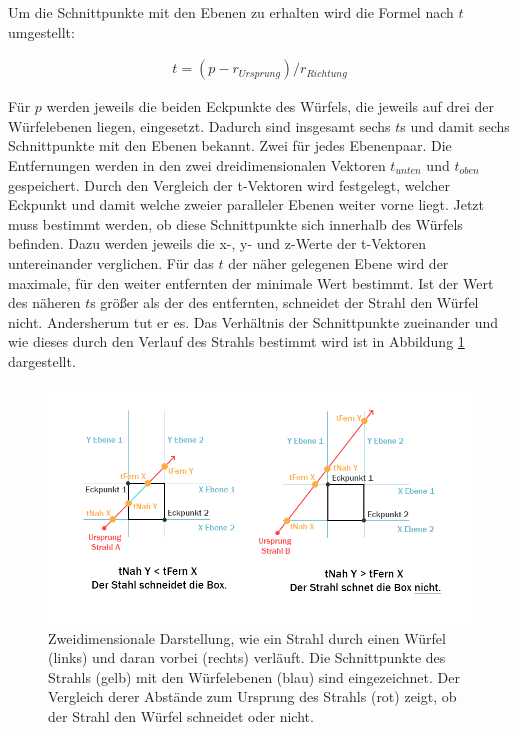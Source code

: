 Um die Schnittpunkte mit den Ebenen zu erhalten wird die Formel nach $t$ umgestellt:

\begin{align}
t=(p-r_{Ursprung})/r_{Richtung}
\end{align}

Für $p$ werden jeweils die beiden Eckpunkte des Würfels, die jeweils auf drei der Würfelebenen liegen, eingesetzt.
Dadurch sind insgesamt sechs $t$s und damit sechs Schnittpunkte mit den Ebenen bekannt. Zwei für jedes Ebenenpaar. Die Entfernungen werden in den zwei dreidimensionalen Vektoren $t_{unten}$ und $t_{oben}$ gespeichert. Durch den Vergleich der t-Vektoren wird festgelegt, welcher Eckpunkt und damit welche zweier paralleler Ebenen weiter vorne liegt. 
Jetzt muss bestimmt werden, ob diese Schnittpunkte sich innerhalb des Würfels befinden.
Dazu werden jeweils die x-, y- und z-Werte der t-Vektoren untereinander verglichen. Für das $t$ der näher gelegenen Ebene wird der maximale, für den weiter entfernten der minimale Wert bestimmt. Ist der Wert des näheren $t$s größer als der des entfernten, schneidet der Strahl den Würfel nicht. Andersherum tut er es.
Das Verhältnis der Schnittpunkte zueinander und wie dieses durch den Verlauf des Strahls bestimmt wird ist in Abbildung \ref{img:rayBoxHit} dargestellt.

\begin{figure}[!htb]
	\centering
	\includegraphics[width=0.9\linewidth]{images/rayBox.png}
	\caption{Zweidimensionale Darstellung, wie ein Strahl durch einen Würfel (links) und daran vorbei (rechts) verläuft. Die Schnittpunkte des Strahls (gelb) mit den Würfelebenen (blau) sind eingezeichnet. Der Vergleich derer Abstände zum Ursprung des Strahls (rot) zeigt, ob der Strahl den Würfel schneidet oder nicht.}
	\label{img:rayBoxHit}
\end{figure}
\FloatBarrier


